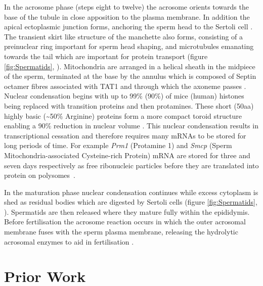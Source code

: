 In the acrosome phase (steps eight to twelve) the acrosome orients towards the base of the tubule in close apposition to the plasma membrane.
In addition the apical ectoplasmic junction forms, anchoring the sperm head to the Sertoli cell \parencite{Wong2008Biology}.
The transient skirt like structure of the manchette also forms, consisting of a preinuclear ring important for sperm head shaping, and microtubules emanating towards the tail which are important for protein transport (figure \ref{fig:Spermatids}, \cite{Lehti2016Formation}).
Mitochondria are arranged in a helical sheath in the midpiece of the sperm, terminated at the base by the annulus which is composed of Septin octamer fibres associated with TAT1 and through which the axoneme passes \parencite{Ho2007Three, Toure2011Septins, Kuo2015SEPT12}.
Nuclear condensation begins with up to 99\% (90\%) of mice (human) histones being replaced with transition proteins and then protamines.
These short (50aa) highly basic (\textasciitilde50\% Arginine) proteins form a more compact toroid structure enabling a 90\% reduction in nuclear volume \parencite{Balhorn2007protamine, Ward2010Function, Yamaguchi2018Reevaluating}.
This nuclear condensation results in transcriptional cessation and therefore requires many mRNAs to be stored for long periods of time.
For example \textit{Prm1} (Protamine 1) and \textit{Smcp} (Sperm Mitochondria-associated Cysteine-rich Protein) mRNA are stored for three and seven days respectively as free ribonucleic particles before they are translated into protein on polysomes~\parencite{Cullinane2015Mechanisms, Kleene1984Translational, Kleene2004Patterns}.

In the maturation phase nuclear condensation continues while excess cytoplasm is shed as residual bodies which are digested by Sertoli cells (figure \ref{fig:Spermatids}, \cite{Lacy1962CERTAIN, Breucker1985Morphogenesis, Hermo2010Surfing}).
Spermatids are then released where they mature fully within the epididymis.
Before fertilisation the acrosome reaction occurs in which the outer acrosomal membrane fuses with the sperm plasma membrane, releasing the hydrolytic acrosomal enzymes to aid in fertilisation \parencite{Jin2011Most}.






\section{Prior Work}

